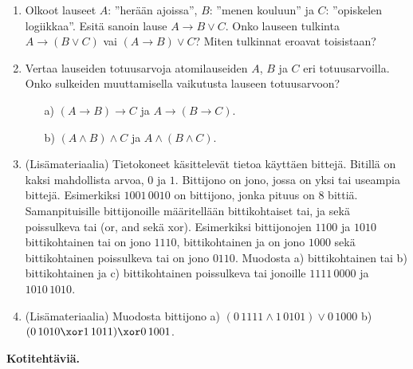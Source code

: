 \begin{enumerate}
\item Olkoot lauseet $A$: ''herään ajoissa'', $B$: ''menen kouluun'' ja $C$: ''opiskelen logiikkaa''.
Esitä sanoin lause $A \to B \lor C$. Onko lauseen tulkinta $A \to (B \lor C)$ vai $(A \to B) \lor C$? Miten tulkinnat eroavat toisistaan? 

\item
Vertaa lauseiden totuusarvoja atomilauseiden $A$, $B$ ja $C$ eri totuusarvoilla. Onko sulkeiden muuttamisella vaikutusta lauseen totuusarvoon?
\begin{itemize}
\item[a)] $(A\to B)\to C$ ja $A\to (B\to C)$.
\item[b)] $(A\land B)\land C$ ja $A\land (B\land C)$.
\end{itemize}

\item (Lisämateriaalia)  Tietokoneet käsittelevät tietoa käyttäen bittejä. Bitillä on kaksi mahdollista arvoa, $0$ ja $1$.
Bittijono on jono, jossa on yksi tai useampia bittejä. Esimerkiksi $1001\, 0010$ on bittijono, jonka pituus on $8$ bittiä. Samanpituisille bittijonoille määritellään bittikohtaiset tai, ja sekä poissulkeva tai (or, and sekä xor). Esimerkiksi bittijonojen $1100$ ja $1010$ bittikohtainen tai on jono $1110$, bittikohtainen ja on jono $1000$ sekä bittikohtainen poissulkeva tai on jono $0110$. Muodosta a) bittikohtainen tai  b) bittikohtainen ja c) bittikohtainen poissulkeva tai jonoille $1111\, 0000$ ja $1010\, 1010$.

\item (Lisämateriaalia)  Muodosta bittijono a)  $(0\, 1111 \land 1\, 0101) \lor 0\, 1000$  b) $(0\, 1010 \xor 1\, 1011) \xor 0\, 1001$. 

\end{enumerate}

{\bf Kotitehtäviä.}

